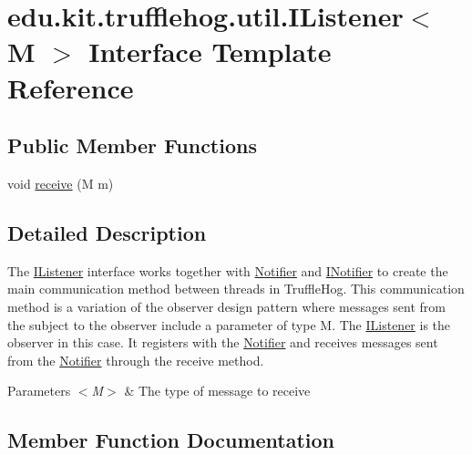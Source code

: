 \hypertarget{interfaceedu_1_1kit_1_1trufflehog_1_1util_1_1_i_listener}{}\section{edu.\+kit.\+trufflehog.\+util.\+I\+Listener$<$ M $>$ Interface Template Reference}
\label{interfaceedu_1_1kit_1_1trufflehog_1_1util_1_1_i_listener}
\subsection*{Public Member Functions}
\begin{DoxyCompactItemize}
\item 
void \hyperlink{interfaceedu_1_1kit_1_1trufflehog_1_1util_1_1_i_listener_a052500b6cbdc4d0087fc44591fe32bc1}{receive} (M m)
\end{DoxyCompactItemize}


\subsection{Detailed Description}
The \hyperlink{interfaceedu_1_1kit_1_1trufflehog_1_1util_1_1_i_listener}{I\+Listener} interface works together with \hyperlink{classedu_1_1kit_1_1trufflehog_1_1util_1_1_notifier}{Notifier} and \hyperlink{interfaceedu_1_1kit_1_1trufflehog_1_1util_1_1_i_notifier}{I\+Notifier} to create the main communication method between threads in Truffle\+Hog. This communication method is a variation of the observer design pattern where messages sent from the subject to the observer include a parameter of type M. The \hyperlink{interfaceedu_1_1kit_1_1trufflehog_1_1util_1_1_i_listener}{I\+Listener} is the observer in this case. It registers with the \hyperlink{classedu_1_1kit_1_1trufflehog_1_1util_1_1_notifier}{Notifier} and receives messages sent from the \hyperlink{classedu_1_1kit_1_1trufflehog_1_1util_1_1_notifier}{Notifier} through the receive method. 


\begin{DoxyParams}{Parameters}
{\em $<$\+M$>$} & The type of message to receive \\
\hline
\end{DoxyParams}


\subsection{Member Function Documentation}
\hypertarget{interfaceedu_1_1kit_1_1trufflehog_1_1util_1_1_i_listener_a052500b6cbdc4d0087fc44591fe32bc1}{}
